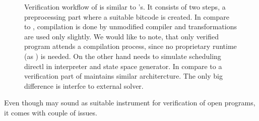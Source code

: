 \begin{figure}[!ht]
{
}
\caption{ Verification workflow of \SymDIVINE is similar to \DIVINE{}'s. It consists
of two steps, a preprocessing part where a suitable \LLVM bitcode is created. In compare to
\DIVINE, compilation is done by unmodified compiler and \LART transformations
are used only slightly. We would like to note, that only verified program
attends a compilation process, since no \SymDIVINE proprietary runtime (as \DIOS) is
needed. On the other hand \SymDIVINE needs to simulate scheduling directl in
interpreter and state space generator. In compare to \DIVINE a verification part
of \SymDIVINE maintains similar architercture. The only big difference is
interfce to external \SMT solver.}\label{fig:symdivine}
\end{figure}

Even though \SymDIVINE may sound as suitable instrument for verification of open
programs, it comes with couple of issues.



